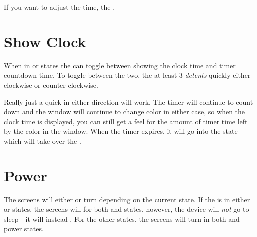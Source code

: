If you want to adjust the time,  the .


\section{Show Clock}

When in  or  states the  can toggle between showing the
clock time and timer countdown time. To toggle between the two,  the
 at least \num{3} \textit{detents} quickly either clockwise or
counter-clockwise.


Really just a quick  in either direction will work.  The timer will
continue to count down and the  window will continue to change color in
either case, so when the clock time is displayed, you can still get a feel for
the amount of timer time left by the color in the  window.  When the
timer expires, it will go into the  state which will take over the
.

\section{Power}

The screens will either  or turn  depending on the current
state.  If the  is in either  or  states, the screens
will  for both  and  states, however, the device will
\textit{not} go to sleep - it will instead .  For the other 
states, the screens will turn  in both  and  power
states.

